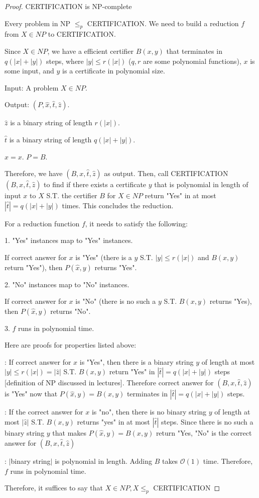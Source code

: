 \documentclass[openany]{article}
\begin{document}
\begin{proof}{CERTIFICATION is NP-complete}

Every problem in NP $\leqslant_p$ CERTIFICATION. We need to build a reduction $f$ from $X \in NP$ to CERTIFICATION.

Since $X\in NP$, we have a efficient certifier $B(x,y)$ that terminates in $q(|x|+|y|)$ steps, where $|y| \leqslant r(|x|)$ ($q, r$ are some polynomial functions), $x$ is some input, and $y$ is a certificate in polynomial size.

Input: A problem $X\in NP$.

Output: $(P, \hat{x}, \hat{t}, \hat{z})$.

\qquad $\hat{z}$ is a binary string of length $r(|x|)$.

\qquad $\hat{t}$ is a binary string of length $q(|x|+|y|)$.

\qquad $\hat{x} = x$. $P=B$.

Therefore, we have $(B, x, \hat{t}, \hat{z})$ as output. Then, call CERTIFICATION$(B, x, \hat{t}, \hat{z})$ to find if there exists a certificate $y$ that is polynomial in length of input $x$ to $X$ S.T. the certifier $B$ for $X\in NP$ return "Yes" in at most $|\hat{t}|=q(|x|+|y|)$ times. This concludes the reduction.

For a reduction function $f$, it needs to satisfy the following:

 1. "Yes" instances map to "Yes" instances.

\qquad If correct answer for $x$ is "Yes" (there is a $y$ S.T. $|y|\leqslant r(|x|)$ and $B(x,y)$ return "Yes"), then $P(\hat{x},y)$ returns "Yes".

 2. "No" instances map to "No" instances.

\qquad If correct answer for $x$ is "No" (there is no such a $y$ S.T. $B(x,y)$ returns "Yes), then $P(\hat{x},y)$ returns "No".

3. $f$ runs in polynomial time.

Here are proofs for properties listed above:

: If correct answer for $x$ is "Yes", then there is a binary string $y$ of length at most $|y| \leqslant r(|x|) = |\hat{z}|$ S.T. $B(x,y)$ return "Yes" in $|\hat{t}| = q(|x|+|y|)$ steps [definition of NP discussed in lectures]. Therefore correct answer for $(B, x, \hat{t}, \hat{z})$ is "Yes" now that $P(\hat{x},y) = B(x,y)$ terminates in $|\hat{t}| = q(|x|+|y|)$ steps.

: If the correct answer for $x$ is "no", then there is no binary string $y$ of length at most $|\hat{z}|$ S.T. $B(x,y)$ returns "yes" in at most $|\hat{t}|$ steps. Since there is no such a binary string $y$ that makes $P(\hat{x},y) = B(x,y)$ return "Yes, "No" is the correct answer for $(B,x,\hat{t},\hat{z})$


: $|$binary string$|$ is polynomial in length. Adding $B$ takes $\mathcal{O}(1)$ time. Therefore, $f$ runs in polynomial time.

Therefore, it suffices to say that $X\in NP, X \leqslant_p$ CERTIFICATION






    
\end{proof}
\end{document}
